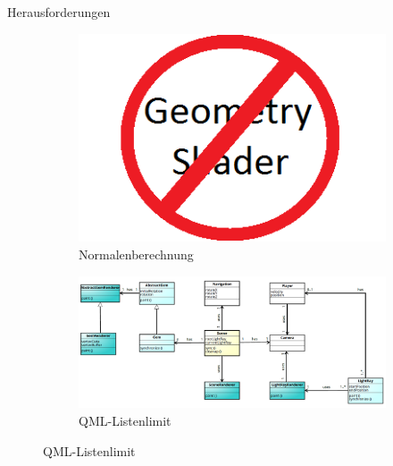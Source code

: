 \slideonetoone
{Herausforderungen}
{	
	\begin{figure}
		\centering
		\begin{subfigure}{\textwidth}
			\centering
			\includegraphics[width=\textwidth, height=0.35\textheight, keepaspectratio]{images/nogeometry}
			\caption{Normalenberechnung}
		\end{subfigure}
		\begin{subfigure}{\textwidth}
			\centering
			\includegraphics[width=\textwidth, height=0.35\textheight, keepaspectratio]{images/klassendiagramm}
			\caption{QML-Listenlimit}
		\end{subfigure}
	\end{figure}
}

